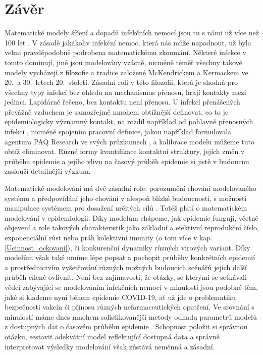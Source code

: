 \section*{Závěr}

Matematické modely šíření a dopadů infekčních nemocí jsou tu s námi už více než 100 let \cite{AndersonMay1991,KeelingRohani2008,VynnyckyWhite2010}. V zásadě jakákoliv infekční nemoc, která nás může napadnout, už byla velmi pravděpodobně podrobena matematickému zkoumání. Některé infekce v tomto dominují, jiné jsou modelovány vzácně, nicméně téměř všechny takové modely vycházejí z filozofie a tradice založené McKendrickem a Kermackem ve 20.\ a 30.\ letech 20.\ století. Zásadní roli v této filozofii, která je shodná pro všechny typy infekcí bez ohledu na mechanismus přenosu, hrají kontakty mezi jedinci. Lapidárně řečeno, bez kontaktu není přenosu. U infekcí přenášených převážně vzduchem je samozřejmě mnohem obtížnější definovat, co to je epidemiologicky významný kontakt, na rozdíl například od pohlavně přenosných infekcí \cite{Rao_etal2021}, nicméně spojením pracovní definice, jakou například formulovala agentura PAQ Research ve svých průzkumech \cite[\url{www.zivotbehempandemie.cz}]{paqcovid}, a kalibrace modelu můžeme tuto obtíž eliminovat. Různé formy kvantifikace kontaktní struktury, jejích změn v průběhu epidemie a jejího vlivu na časový průběh epidemie si jistě v budoucnu zaslouží detailnější výzkum.

Matematické modelování má dvě zásadní role: porozumění chování modelovaného systému a předpovídání jeho chování v alespoň blízké budoucnosti, s možností manipulace systémem pro dosažení určitých cílů \cite{GerleeLundh2016}. Totéž platí o matematickém modelování v epidemiologii. Díky modelům chápeme, jak epidemie fungují, včetně objevení a role takových charakteristik jako základní a efektivní reprodukční číslo, exponenciální růst nebo práh kolektivní imunity (o tom více v kap.\,\ref{Ucinnost_ockovani}), či konkurenční dynamiky různých virových variant. Díky modelům však také umíme lépe popsat a pochopit průběhy konkrétních epidemií a prostřednictvím vyšetřování různých možných budoucích scénářů jejich další průběh cíleně ovlivnit. Není bez zajímavosti, že otázky, se kterými se setkávali vědci zabývající se modelováním infekčních nemocí v minulosti jsou podobné těm, jaké si klademe nyní během epidemie COVID-19, ať už jde o problematiku bezpečnosti vakcín či přínosu různých nefarmaceutických opatření. Ve srovnání s minulostí máme dnes mnohem sofistikovanější metody odhadu parametrů modelů z dostupných dat o časovém průběhu epidemie \cite{King_etal2016}. Schopnost položit si správnou otázku, sestavit adekvátní model reflektující dostupná data a správně interpretovat výsledky modelování však zůstává neměnná a zásadní.  

